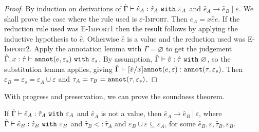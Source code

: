\begin{proof}
By induction on derivations of $\hat \Gamma \vdash \hat e_A: \hat \tau_A~\mathtt{with}~
\varepsilon_A$ and $\hat e_A \longrightarrow \hat e_B \mid \varepsilon$. We shall
prove the case where the rule used is \textsc{$\varepsilon$-Import}. Then $e_A =
{x}{\hat e}{e}$. If the reduction rule used was
\textsc{E-Import1} then the result follows by applying the inductive hypothesis to
$\hat e$. Otherwise $\hat e$ is a value and the reduction used was
\textsc{E-Import2}. Apply the annotation lemma with $\Gamma = \varnothing$ to
get the judgement $\hat \Gamma, x: \hat \tau \vdash \mathtt{annot}(e, \varepsilon_s)~
\mathtt{with}~ \varepsilon_s$. By assumption, $\hat \Gamma \vdash \hat v: \hat \tau~
 \mathtt{with}~ \varnothing$, so the substitution lemma applies, giving $\hat \Gamma
\vdash [\hat v/x]\mathtt{annot}(e, \varepsilon): \mathtt{annot}(\tau, \varepsilon_s)$. Then
$\varepsilon_B = \varepsilon_s = \varepsilon_A \cup \varepsilon$ and $\tau_A =
\tau_B = \mathtt{annot}(\tau, \varepsilon_s)$.

\end{proof}

With progress and preservation, we can prove the soundness theorem.

\begin{theorem}
If $\hat \Gamma \vdash \hat e_A: \hat \tau_A~\mathtt{with}~ \varepsilon_A$ and $\hat e_A$ is not a value, then $\hat e_A \longrightarrow \hat e_B~|~\varepsilon$, where $\hat \Gamma \vdash \hat e_B: \hat \tau_B~\mathtt{with}~ \varepsilon_B$ and $\hat \tau_B <: \hat \tau_A$ and $\varepsilon_B \cup \varepsilon \subseteq \varepsilon_A$, for some $\hat e_B, \varepsilon, \hat \tau_B, \varepsilon_B$.
\end{theorem}


